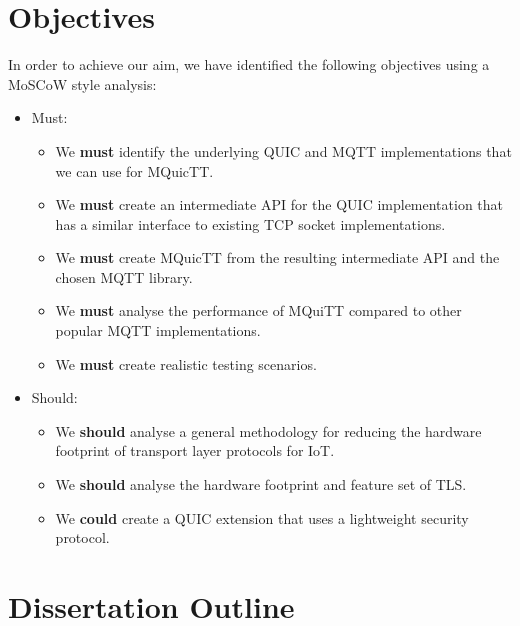 \section{Objectives}

In order to achieve our aim, we have identified the following objectives using a MoSCoW style analysis:

\begin{itemize}
    \item Must:
    \begin{itemize}
        \item We \textbf{must} identify the underlying QUIC and MQTT implementations that we can use for MQuicTT.
        \item We \textbf{must} create an intermediate API for the QUIC implementation that has a similar interface to existing TCP socket implementations.
        \item We \textbf{must} create MQuicTT from the resulting intermediate API and the chosen MQTT library.
        \item We \textbf{must} analyse the performance of MQuiTT compared to other popular MQTT implementations.
        \item We \textbf{must} create realistic testing scenarios.
    \end{itemize}
    \item Should:
    \begin{itemize}
        \item We \textbf{should} analyse a general methodology for reducing the hardware footprint of transport layer protocols for IoT.
        \item We \textbf{should} analyse the hardware footprint and feature set of TLS.
    \end{itemize}
    \begin{itemize}
        \item We \textbf{could} create a QUIC extension that uses a lightweight security protocol.
    \end{itemize}
\end{itemize}

\section{Dissertation Outline}

